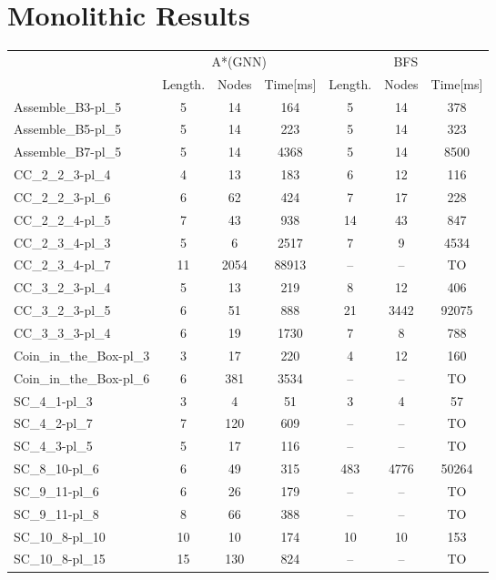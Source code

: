 \documentclass{article}
\newcommand{\BFSres}{BFS}
\newcommand{\GNNres}{A*(GNN)}
\newcommand{\planLength}{Length.}
\newcommand{\nodesExp}{Nodes}
\newcommand{\solvingTime}{Time}
\newcommand{\unsolvedColumn}{--}
\newcommand{\myTO}{TO}
\begin{document}
\section*{Monolithic Results}
\begin{longtable}[!ht]{l|ccc|ccc}
\centering
\multirow2{*}{\textbf{Instance Name}} & \multicolumn{3}{c|}{\GNNres} & \multicolumn{3}{c}{\BFSres} \\
\cline{2-7}
& \planLength & \nodesExp & \solvingTime [ms] & \planLength & \nodesExp & \solvingTime [ms] \\
\hline
Assemble\_B3-pl\_5 & 5 & 14 & 164 & 5 & 14 & 378 \\
Assemble\_B5-pl\_5 & 5 & 14 & 223 & 5 & 14 & 323 \\
Assemble\_B7-pl\_5 & 5 & 14 & 4368 & 5 & 14 & 8500 \\
CC\_2\_2\_3-pl\_4 & 4 & 13 & 183 & 6 & 12 & 116 \\
CC\_2\_2\_3-pl\_6 & 6 & 62 & 424 & 7 & 17 & 228 \\
CC\_2\_2\_4-pl\_5 & 7 & 43 & 938 & 14 & 43 & 847 \\
CC\_2\_3\_4-pl\_3 & 5 & 6 & 2517 & 7 & 9 & 4534 \\
CC\_2\_3\_4-pl\_7 & 11 & 2054 & 88913 & \unsolvedColumn & \unsolvedColumn & \myTO \\
CC\_3\_2\_3-pl\_4 & 5 & 13 & 219 & 8 & 12 & 406 \\
CC\_3\_2\_3-pl\_5 & 6 & 51 & 888 & 21 & 3442 & 92075 \\
CC\_3\_3\_3-pl\_4 & 6 & 19 & 1730 & 7 & 8 & 788 \\
Coin\_in\_the\_Box-pl\_3 & 3 & 17 & 220 & 4 & 12 & 160 \\
Coin\_in\_the\_Box-pl\_6 & 6 & 381 & 3534 & \unsolvedColumn & \unsolvedColumn & \myTO \\
SC\_4\_1-pl\_3 & 3 & 4 & 51 & 3 & 4 & 57 \\
SC\_4\_2-pl\_7 & 7 & 120 & 609 & \unsolvedColumn & \unsolvedColumn & \myTO \\
SC\_4\_3-pl\_5 & 5 & 17 & 116 & \unsolvedColumn & \unsolvedColumn & \myTO \\
SC\_8\_10-pl\_6 & 6 & 49 & 315 & 483 & 4776 & 50264 \\
SC\_9\_11-pl\_6 & 6 & 26 & 179 & \unsolvedColumn & \unsolvedColumn & \myTO \\
SC\_9\_11-pl\_8 & 8 & 66 & 388 & \unsolvedColumn & \unsolvedColumn & \myTO \\
SC\_10\_8-pl\_10 & 10 & 10 & 174 & 10 & 10 & 153 \\
SC\_10\_8-pl\_15 & 15 & 130 & 824 & \unsolvedColumn & \unsolvedColumn & \myTO \\

\end{longtable}
\end{document}
